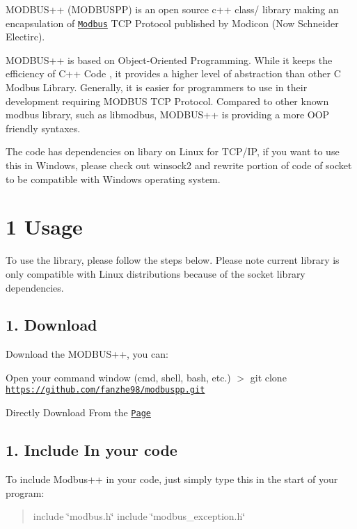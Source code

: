 M\+O\+D\+B\+U\+S++ (M\+O\+D\+B\+U\+S\+PP) is an open source c++ class/ library making an encapsulation of \href{https://en.wikipedia.org/wiki/Modbus}{\tt Modbus} T\+CP Protocol published by Modicon (Now Schneider Electirc).

M\+O\+D\+B\+U\+S++ is based on Object-\/\+Oriented Programming. While it keeps the efficiency of C++ Code , it provides a higher level of abstraction than other C Modbus Library. Generally, it is easier for programmers to use in their development requiring M\+O\+D\+B\+US T\+CP Protocol. Compared to other known modbus library, such as libmodbus, M\+O\+D\+B\+U\+S++ is providing a more O\+OP friendly syntaxes.

The code has dependencies on libary on Linux for T\+C\+P/\+IP, if you want to use this in Windows, please check out winsock2 and rewrite portion of code of socket to be compatible with Windows operating system. 



\section*{1 Usage}

To use the library, please follow the steps below. Please note current library is only compatible with Linux distributions because of the socket library dependencies.

\subsection*{1. Download}

Download the M\+O\+D\+B\+U\+S++, you can\+:
\begin{DoxyItemize}
\item Open your command window (cmd, shell, bash, etc.) $>$ git clone \href{https://github.com/fanzhe98/modbuspp.git}{\tt https\+://github.\+com/fanzhe98/modbuspp.\+git}
\item Directly Download From the \href{https://github.com/fanzhe98/modbuspp.git}{\tt Page}
\end{DoxyItemize}

\subsection*{1. Include In your code}

To include Modbus++ in your code, just simply type this in the start of your program\+: \begin{quote}
include \char`\"{}modbus.\+h\char`\"{} include \char`\"{}modbus\+\_\+exception.\+h\char`\"{} \end{quote}




